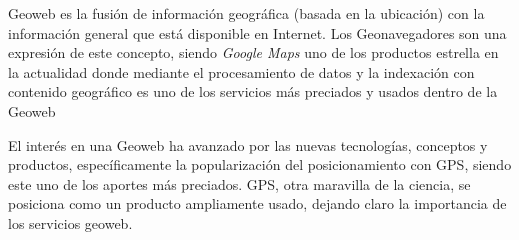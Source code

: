Geoweb es la fusión de información geográfica (basada en la ubicación) con la
información general que está disponible en Internet. Los Geonavegadores son
una expresión de este concepto, siendo \emph{Google Maps} uno de los productos
estrella en la actualidad donde mediante el procesamiento de datos y la
indexación con contenido geográfico es uno de los servicios más preciados y
usados dentro de la Geoweb

El interés en una Geoweb ha avanzado por las nuevas tecnologías,
conceptos y productos, específicamente la popularización del posicionamiento
con GPS, siendo este uno de los aportes más preciados. GPS, otra maravilla de
la ciencia, se posiciona como un producto ampliamente usado, dejando claro la
importancia de los servicios geoweb.